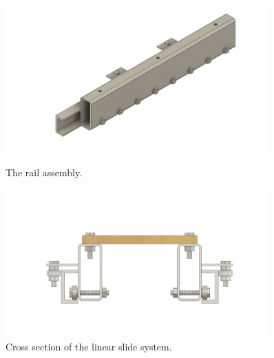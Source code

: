 \documentclass[9pt]{article} %
\numberwithin{equation}{section} %
\begin{document}
\begin{figure}
    \centering
    \begin{minipage}{0.49\textwidth}
        \centering
        \includegraphics[scale=0.5, width=0.9\textwidth, trim={5cm 0cm 5cm 0cm}, clip]{cad_files/Rail Assembly v25.png} %
        \caption{The rail assembly.}
        \label{fig:rail_assembly}
    \end{minipage}\hfill
    \begin{minipage}{0.49\textwidth}
        \centering
        \includegraphics[scale=0.5, width=0.9\textwidth, trim={5cm 0cm 5cm 0cm}, clip]{cad_files/Linear Slide v14 FRONT.png} %
        \caption{Cross section of the linear slide system.}
        \label{fig:linear_slide_cross_section}
    \end{minipage}
\end{figure} 
\end{document}
